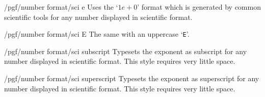 \documentclass[a4paper]{ltxdoc}
\begin{document}
\begin{key}{/pgf/number format/sci e}
    Uses the `$1e{+}0$' format which is generated by common scientific tools
    for any number displayed in scientific format.

\begin{codeexample}[]
\end{codeexample}
\end{key}

\begin{key}{/pgf/number format/sci E}
    The same with an uppercase `\texttt{E}'.
\begin{codeexample}[]
\end{codeexample}
\end{key}

\begin{key}{/pgf/number format/sci subscript}
    Typesets the exponent as subscript for any number displayed in scientific
    format. This style requires very little space.
\begin{codeexample}[]
\end{codeexample}
\end{key}

\begin{key}{/pgf/number format/sci superscript}
    Typesets the exponent as superscript for any number displayed in scientific
    format. This style requires very little space.
\begin{codeexample}[]
\end{codeexample}
\end{key}
\end{document}
